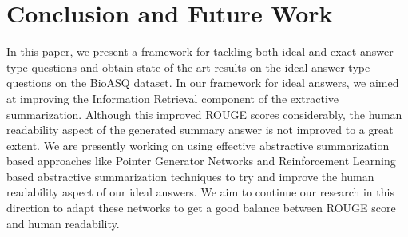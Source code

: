 \documentclass[11pt,a4paper]{article}
\begin{document}


\section{Conclusion and Future Work}
\label{future}
In this paper, we present a framework for tackling both ideal and exact answer type questions and obtain state of the art results on the ideal answer type questions on the BioASQ dataset. In our framework for ideal answers, we aimed at improving the Information Retrieval component of the extractive summarization. Although this improved ROUGE scores considerably, the human readability aspect of the generated summary answer is not improved to a great extent. We are presently working on using effective abstractive summarization based approaches like Pointer Generator Networks \cite{PGC} and Reinforcement Learning based abstractive summarization techniques \cite{salesforce} to try and improve the human readability aspect of our ideal answers. We aim to continue our research in this direction to adapt these networks to get a good balance between ROUGE score and human readability.



%
%



\appendix
\end{document}
